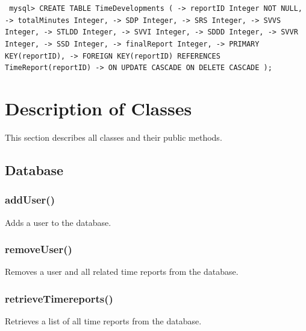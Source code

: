 \documentclass{article}
\begin{document}
\small
\texttt{
\noindent mysql> CREATE TABLE TimeDevelopments (\newline
\indent\indent\indent -> reportID Integer NOT NULL,\newline
\indent\indent\indent -> totalMinutes Integer,\newline
\indent\indent\indent -> SDP Integer,\newline
\indent\indent\indent -> SRS Integer,\newline
\indent\indent\indent -> SVVS Integer,\newline
\indent\indent\indent -> STLDD Integer,\newline
\indent\indent\indent -> SVVI Integer,\newline
\indent\indent\indent -> SDDD Integer,\newline
\indent\indent\indent -> SVVR Integer,\newline
\indent\indent\indent -> SSD Integer,\newline
\indent\indent\indent -> finalReport Integer,\newline
\indent\indent\indent -> PRIMARY KEY(reportID),\newline
\indent\indent\indent -> FOREIGN KEY(reportID) REFERENCES TimeReport(reportID)\newline
\indent\indent\indent -> ON UPDATE CASCADE ON DELETE CASCADE );\newline
}
\normalsize
\newpage
\section{Description of Classes}
This section describes all classes and their public methods.

\subsection{Database}
\subsubsection{addUser()}
Adds a user to the database.
\subsubsection{removeUser()}
Removes a user and all related time reports from the database.
\subsubsection{retrieveTimereports()}
Retrieves a list of all time reports from the database.
\end{document}
